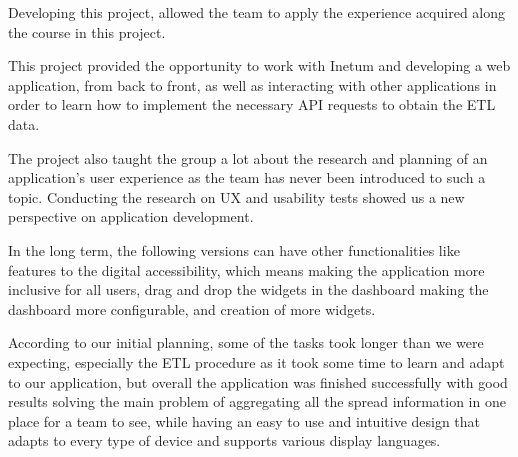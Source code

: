 \documentclass[a4paper,twoside,10pt]{report}
\begin{document}
Developing this project, allowed the team to apply the experience acquired along the course in this project.

This project provided the opportunity to work with Inetum and developing a web application, from back to front, as well as interacting with other applications in order to learn how to implement the necessary API requests to obtain the ETL data.

The project also taught the group a lot about the research and planning of an application's user experience as the team has never been introduced to such a topic. Conducting the research on UX and usability tests showed us a new perspective on application development.

In the long term, the following versions can have other functionalities like features to the digital accessibility, which means making the application more inclusive for all users, drag and drop the widgets in the dashboard making the dashboard more configurable, and creation of more widgets.

According to our initial planning, some of the tasks took longer than we were expecting, especially the ETL procedure as it took some time to learn and adapt to our application, but overall the application was finished successfully with good results solving the main problem of aggregating all the spread information in one place for a team to see, while having an easy to use and intuitive design that adapts to every type of device and supports various display languages.
\end{document}
